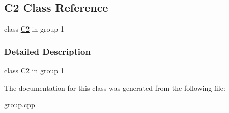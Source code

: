 \hypertarget{class_c2}{}\subsection{C2 Class Reference}
\label{class_c2}


class \hyperlink{class_c2}{C2} in group 1  




\subsubsection{Detailed Description}
class \hyperlink{class_c2}{C2} in group 1 

The documentation for this class was generated from the following file\+:\begin{DoxyCompactItemize}
\item 
\hyperlink{group_8cpp}{group.\+cpp}\end{DoxyCompactItemize}

